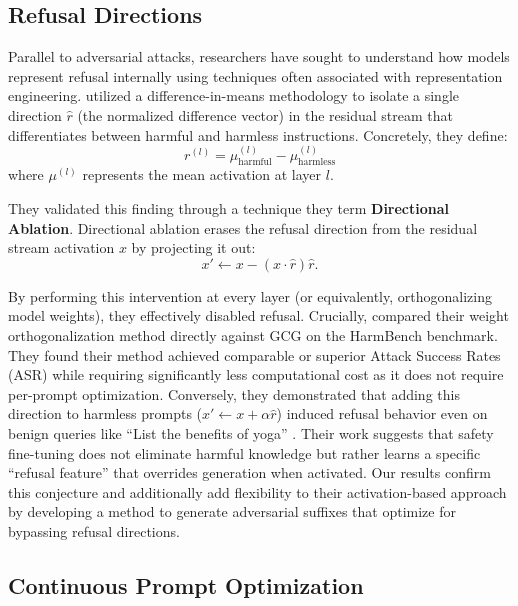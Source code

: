 \documentclass[letterpaper]{article} %
\begin{document}
\subsection{Refusal Directions}
Parallel to adversarial attacks, researchers have sought to understand how models represent refusal internally using techniques often associated with representation engineering. \cite{arditi2024refusal} utilized a difference-in-means methodology to isolate a single direction $\hat{r}$ (the normalized difference vector) in the residual stream that differentiates between harmful and harmless instructions. Concretely, they define:
\begin{equation}
    r^{(l)} = \mu^{(l)}_{\text{harmful}} - \mu^{(l)}_{\text{harmless}}
\end{equation}
where $\mu^{(l)}$ represents the mean activation at layer $l$.

They validated this finding through a technique they term \textbf{Directional Ablation}. Directional ablation erases the refusal direction from the residual stream activation $x$ by projecting it out:
\begin{equation}
    x' \leftarrow x - (x \cdot \hat{r})\hat{r}.
\end{equation}

By performing this intervention at every layer (or equivalently, orthogonalizing model weights), they effectively disabled refusal. Crucially, \cite{arditi2024refusal} compared their weight orthogonalization method directly against GCG on the HarmBench benchmark. They found their method achieved comparable or superior Attack Success Rates (ASR) while requiring significantly less computational cost as it does not require per-prompt optimization. Conversely, they demonstrated that adding this direction to harmless prompts ($x' \leftarrow x + \alpha \hat{r}$) induced refusal behavior even on benign queries like ``List the benefits of yoga'' \citep{arditi2024refusal}. Their work suggests that safety fine-tuning does not eliminate harmful knowledge but rather learns a specific ``refusal feature'' that overrides generation when activated. Our results confirm this conjecture and additionally add flexibility to their activation-based approach by developing a method to generate adversarial suffixes that optimize for bypassing refusal directions. 

\subsection{Continuous Prompt Optimization}
\end{document}
